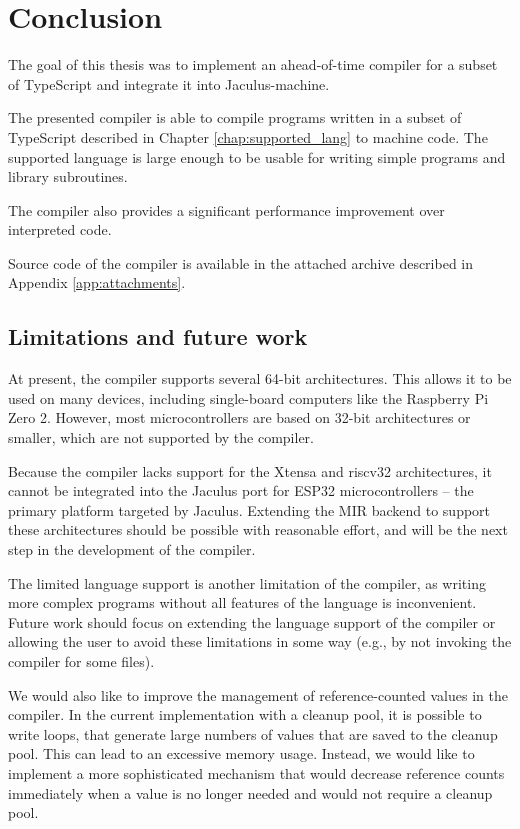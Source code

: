 \chapter{Conclusion}


The goal of this thesis was to implement an ahead-of-time compiler for a subset of TypeScript and integrate it into Jaculus-machine.

The presented compiler is able to compile programs written in a subset of TypeScript described in Chapter \ref{chap:supported_lang} to machine code. The supported language is large enough to be usable for writing simple programs and library subroutines.

The compiler also provides a significant performance improvement over interpreted code.

Source code of the compiler is available in the attached archive described in Appendix \ref{app:attachments}.


\section{Limitations and future work}

At present, the compiler supports several 64-bit architectures. This allows it to be used on many devices, including single-board computers like the Raspberry Pi Zero 2. However, most microcontrollers are based on 32-bit architectures or smaller, which are not supported by the compiler.

Because the compiler lacks support for the Xtensa and riscv32 architectures, it cannot be integrated into the Jaculus port for ESP32 microcontrollers -- the primary platform targeted by Jaculus. Extending the MIR backend to support these architectures should be possible with reasonable effort, and will be the next step in the development of the compiler.

The limited language support is another limitation of the compiler, as writing more complex programs without all features of the language is inconvenient. Future work should focus on extending the language support of the compiler or allowing the user to avoid these limitations in some way (e.g., by not invoking the compiler for some files).

We would also like to improve the management of reference-counted values in the compiler. In the current implementation with a cleanup pool, it is possible to write loops, that generate large numbers of values that are saved to the cleanup pool. This can lead to an excessive memory usage. Instead, we would like to implement a more sophisticated mechanism that would decrease reference counts immediately when a value is no longer needed and would not require a cleanup pool.
